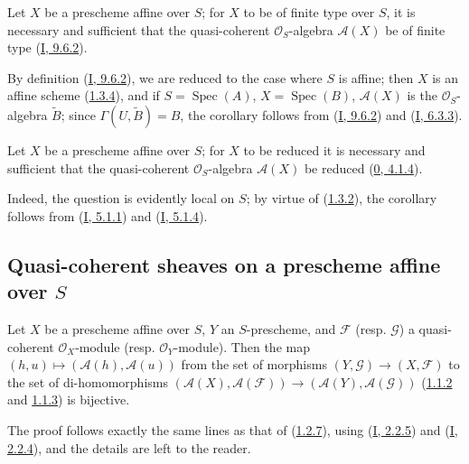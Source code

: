\begin{corollary}[1.3.7]
\label{II.1.3.7}
Let $X$ be a prescheme affine over $S$; for $X$ to be of finite type
over $S$, it is necessary and sufficient that the quasi-coherent
$\mathcal{O}_S$-algebra $\mathcal{A}(X)$ be of finite type
(\hyperref[I.9.6.2]{I, 9.6.2}).
\end{corollary}

By definition (\hyperref[I.9.6.2]{I, 9.6.2}), we are reduced to the case
where $S$ is affine; then $X$ is an affine scheme
(\hyperref[II.1.3.4]{1.3.4}), and if $S=\operatorname{Spec}(A)$,
$X=\operatorname{Spec}(B)$, $\mathcal{A}(X)$ is the
$\mathcal{O}_S$-algebra $\widetilde{B}$; since
$\Gamma(U,\widetilde{B})=B$, the corollary follows from
(\hyperref[I.9.6.2]{I, 9.6.2}) and
(\hyperref[I.6.3.3]{I, 6.3.3}).

\begin{corollary}[1.3.8]
\label{II.1.3.8}
Let $X$ be a prescheme affine over $S$; for $X$ to be reduced it is
necessary and sufficient that the quasi-coherent $\mathcal{O}_S$-algebra
$\mathcal{A}(X)$ be reduced
(\hyperref[0.4.1.4]{0, 4.1.4}).
\end{corollary}

Indeed, the question is evidently local on $S$; by virtue of
(\hyperref[II.1.3.2]{1.3.2}), the corollary follows from
(\hyperref[I.5.1.1]{I, 5.1.1}) and
(\hyperref[I.5.1.4]{I, 5.1.4}).

\subsection{Quasi-coherent sheaves on a prescheme affine over
$S$}
\label{subsection:II.1.4}

\begin{proposition}[1.4.1]
\label{II.1.4.1}
Let $X$ be a prescheme affine over $S$, $Y$ an $S$-prescheme, and
$\mathcal{F}$ (resp. $\mathcal{G}$) a quasi-coherent $\mathcal{O}_X$-module
(resp. $\mathcal{O}_Y$-module). Then the map
$(h,u)\mapsto(\mathcal{A}(h),\mathcal{A}(u))$ from the set of morphisms
$(Y,\mathcal{G})\to(X,\mathcal{F})$ to the set of di-homomorphisms
$(\mathcal{A}(X),\mathcal{A}(\mathcal{F}))\to
(\mathcal{A}(Y),\mathcal{A}(\mathcal{G}))$
(\hyperref[II.1.1.2]{1.1.2} and
\hyperref[II.1.1.3]{1.1.3}) is bijective.
\end{proposition}

The proof follows exactly the same lines as that of
(\hyperref[II.1.2.7]{1.2.7}), using
(\hyperref[I.2.2.5]{I, 2.2.5}) and
(\hyperref[I.2.2.4]{I, 2.2.4}), and the details are left to the
reader.

